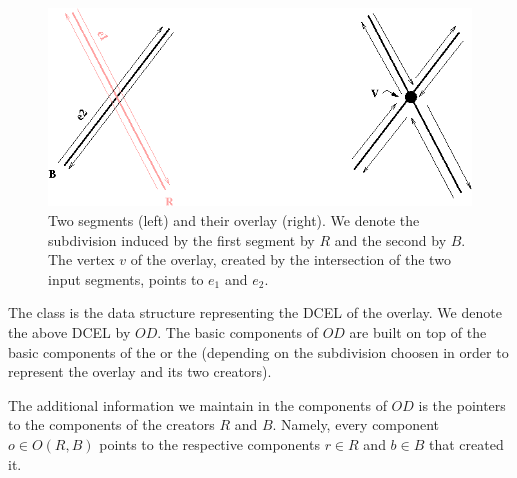 \begin{ccTexOnly}
\begin{figure}[h]
    \begin{ccTexOnly}
        \centerline{
           \includegraphics{simple_overlay.eps}
           }
    \end{ccTexOnly}
\caption{Two segments (left) and their overlay (right). 
We denote the subdivision induced by the first segment by $R$ and the second by $B$. 
The vertex $v$ of the overlay, created by the intersection of the two input segments, 
points to $e_1$ and $e_2$.}
\label{fig:simple_overlay_example}
\end{figure}

The 
class is the data structure representing the DCEL of the overlay. 
We denote the above DCEL by $OD$.
The basic components of $OD$ are built 
on top of the basic components of the  or 
the  
(depending on the subdivision choosen in 
order to represent the overlay and its two creators).

The additional information we maintain in the components of $OD$ 
is the pointers to the components of the creators $R$ and $B$.
Namely, every component $o \in O(R,B)$ points to the 
respective components $r \in R$ and $b \in B$ that created it. 


\end{ccTexOnly}
